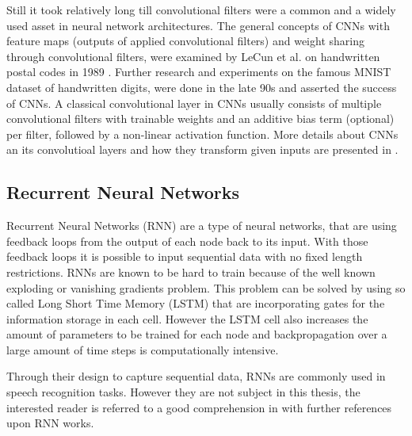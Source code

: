 Still it took relatively long till convolutional filters were a common and a widely used asset in neural network architectures.
The general concepts of CNNs with feature maps (outputs of applied convolutional filters) and weight sharing through convolutional filters, were examined by LeCun et al. on handwritten postal codes in 1989 \cite{LeCun1989_Generalization}.
Further research and experiments on the famous MNIST dataset of handwritten digits, were done in the late 90s \cite{LeCun1998} and asserted the success of CNNs.
A classical convolutional layer in CNNs usually consists of multiple convolutional filters with trainable weights and an additive bias term (optional) per filter, followed by a non-linear activation function.
More details about CNNs an its convolutioal layers and how they transform given inputs are presented in .




\subsection{Recurrent Neural Networks}\label{sec:prev_nn_rnn}
Recurrent Neural Networks (RNN) are a type of neural networks, that are using feedback loops from the output of each node back to its input.
With those feedback loops it is possible to input sequential data with no fixed length restrictions.
RNNs are known to be hard to train because of the well known exploding or vanishing gradients problem.
This problem can be solved by using so called Long Short Time Memory (LSTM) that are incorporating gates for the information storage in each cell. 
However the LSTM cell also increases the amount of parameters to be trained for each node and backpropagation over a large amount of time steps is computationally intensive.

Through their design to capture sequential data, RNNs are commonly used in speech recognition tasks.
However they are not subject in this thesis, the interested reader is referred to a good comprehension in \cite{Staudenmeyer2019} with further references upon RNN works.



